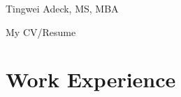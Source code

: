 \documentclass[
	10pt, %
]{FreemanCV}
\begin{document}
\begin{paracol}{2} %


\parbox[][0.11\textheight][c]{\linewidth}{ %
	\centering %
	
	{\sffamily\Huge Tingwei Adeck, MS, MBA} %
	
	
	{\cursivefont\Huge\textcolor{headings}{My CV/Resume}}
	
	\vfill %
}






\section{Work Experience}{\faAlignJustify}



	

\end{paracol}
\end{document}
